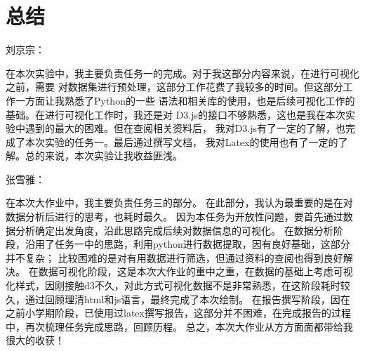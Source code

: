 \documentclass[a4paper]{article}
\begin{document}
\section{总结}
刘京宗：

在本次实验中，我主要负责任务一的完成。对于我这部分内容来说，在进行可视化之前，需要
对数据集进行预处理，这部分工作花费了我较多的时间。但这部分工作一方面让我熟悉了Python的一些
语法和相关库的使用，也是后续可视化工作的基础。在进行可视化工作时，我还是对
D3.js的接口不够熟悉，这也是我在本次实验中遇到的最大的困难。但在查阅相关资料后，
我对D3.js有了一定的了解，也完成了本次实验的任务一。最后通过撰写文档，
我对Latex的使用也有了一定的了解。总的来说，本次实验让我收益匪浅。

张雪雅：

在本次大作业中，我主要负责任务三的部分。
在此部分，我认为最重要的是在对数据分析后进行的思考，也耗时最久。
因为本任务为开放性问题，要首先通过数据分析确定出发角度，沿此思路完成后续对数据信息的可视化。
在数据分析阶段，沿用了任务一中的思路，利用python进行数据提取，因有良好基础，这部分并不复杂；
比较困难的是对有用数据进行筛选，但通过资料的查阅也得到良好解决。
在数据可视化阶段，这是本次大作业的重中之重，在数据的基础上考虑可视化样式，因刚接触d3不久，对此方式可视化数据不是非常熟悉，在这阶段耗时较久，通过回顾理清html和js语言，最终完成了本次绘制。
在报告撰写阶段，因在之前小学期阶段，已使用过latex撰写报告，这部分并不困难，在完成报告的过程中，再次梳理任务完成思路，回顾历程。
总之，本次大作业从方方面面都带给我很大的收获！
\newpage

\end{document}
